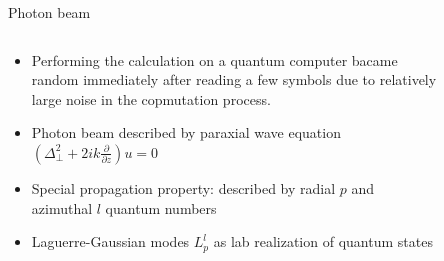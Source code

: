 \documentclass[aspectratio=169,9pt]{beamer}
\begin{document}
\begin{frame}[t]{Photon beam}
  \begin{columns}[T]
    \begin{column}[]{0.45\textwidth}
      \begin{itemize}
        \item Performing the calculation on a quantum computer bacame random immediately after reading a few symbols due to relatively large noise in the copmutation process.
        \vspace*{1em}
        \item Photon beam described by paraxial wave equation $\left(\Delta_\perp^2+2ik\frac{\partial}{\partial z}\right)u=0$
        \item Special propagation property: described by radial $p$ and azimuthal $l$ quantum numbers
        \item Laguerre-Gaussian modes $L_p^l$ as lab realization of quantum states
      \end{itemize}
    \end{column}
    \begin{column}[]{0.05\textwidth}
    \end{column}
    \begin{column}[]{0.45\textwidth}
      \vspace*{-3em}
      \begin{figure}

\end{figure}
\end{column}
\end{columns}
\end{frame}
\end{document}
